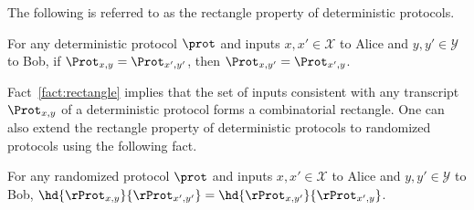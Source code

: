 The following is referred to as the rectangle property of deterministic protocols. 
\begin{fact}\label{fact:rectangle}
	For any deterministic protocol $\prot$ and inputs $x,x' \in \mathcal{X}$ to Alice and $y,y' \in \mathcal{Y}$ to Bob, if $\Prot_{x,y} = \Prot_{x',y'}$, then $\Prot_{x,y'} = \Prot_{x',y}$. 
\end{fact}
\noindent
Fact~\ref{fact:rectangle} implies that the set of inputs consistent with any transcript $\Prot_{x,y}$ of a deterministic protocol forms a combinatorial rectangle. 
One can also extend the rectangle property of deterministic protocols to randomized protocols using the following fact. 
\begin{fact}\label{fact:r-rectangle}
	For any randomized protocol $\prot$ and inputs $x,x' \in \mathcal{X}$ to Alice and $y,y' \in \mathcal{Y}$ to Bob, $\hd{\rProt_{x,y}}{\rProt_{x',y'}} = \hd{\rProt_{x,y'}}{\rProt_{x',y}}$. 
\end{fact}
